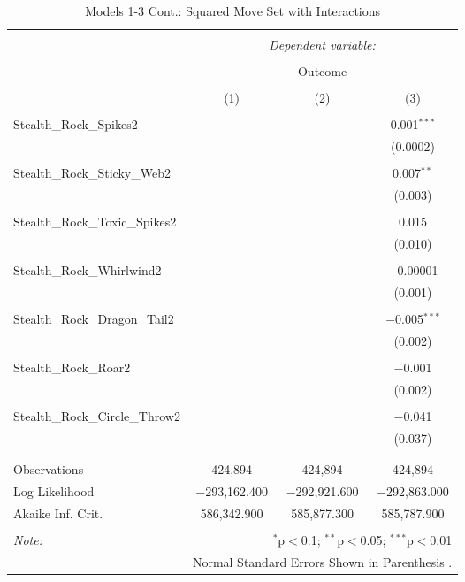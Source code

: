 \documentclass[12pt,twoside]{reedthesis}
\begin{document}
  \begin{table}[!htbp] \centering 
    \caption{Models 1-3 Cont.: Squared Move Set with Interactions} 
    \label{} 
  \begin{tabular}{@{\extracolsep{5pt}}lccc} 
  \\[-1.8ex]\hline 
  \hline \\[-1.8ex] 
   & \multicolumn{3}{c}{\textit{Dependent variable:}} \\ 
  \cline{2-4} 
  \\[-1.8ex] & \multicolumn{3}{c}{Outcome} \\ 
  \\[-1.8ex] & (1) & (2) & (3)\\ 
  \hline \\[-1.8ex] 
   Stealth\_Rock\_Spikes2 &  &  & 0.001$^{***}$ \\ 
    &  &  & (0.0002) \\ 
    & & & \\ 
   Stealth\_Rock\_Sticky\_Web2 &  &  & 0.007$^{**}$ \\ 
    &  &  & (0.003) \\ 
    & & & \\ 
   Stealth\_Rock\_Toxic\_Spikes2 &  &  & 0.015 \\ 
    &  &  & (0.010) \\ 
    & & & \\ 
   Stealth\_Rock\_Whirlwind2 &  &  & $-$0.00001 \\ 
    &  &  & (0.001) \\ 
    & & & \\ 
   Stealth\_Rock\_Dragon\_Tail2 &  &  & $-$0.005$^{***}$ \\ 
    &  &  & (0.002) \\ 
    & & & \\ 
   Stealth\_Rock\_Roar2 &  &  & $-$0.001 \\ 
    &  &  & (0.002) \\ 
    & & & \\ 
   Stealth\_Rock\_Circle\_Throw2 &  &  & $-$0.041 \\ 
    &  &  & (0.037) \\ 
    & & & \\ 
  \hline \\[-1.8ex] 
  Observations & 424,894 & 424,894 & 424,894 \\ 
  Log Likelihood & $-$293,162.400 & $-$292,921.600 & $-$292,863.000 \\ 
  Akaike Inf. Crit. & 586,342.900 & 585,877.300 & 585,787.900 \\ 
  \hline 
  \hline \\[-1.8ex] 
  \textit{Note:}  & \multicolumn{3}{r}{$^{*}$p$<$0.1; $^{**}$p$<$0.05; $^{***}$p$<$0.01} \\ 
   & \multicolumn{3}{r}{Normal Standard Errors Shown in Parenthesis .} \\ 
  \end{tabular} 
  \end{table}
  
\end{document}
